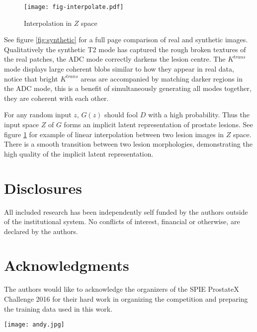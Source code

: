 \documentclass[a4paper,12pt]{spieman}  %
\newcommand{\ktrans}{$K^{\mathit{trans}}$}
\begin{document}
\begin{spacing}{1}
\begin{figure}
\begin{center}
  \texttt{[image: fig-interpolate.pdf]}
\end{center}
\caption{Interpolation in $Z$ space}
\label{fig:interpolation}
\end{figure}

	See figure \ref{fig:synthetic} for a full page comparison of real and
	synthetic images. Qualitatively the synthetic T2 mode has captured
	the rough broken textures of the real patches, the ADC mode correctly
	darkens the lesion centre. The \ktrans{} mode displays large coherent
	blobs similar to how they appear in real data, notice that bright
	\ktrans{} areas are accompanied by matching darker regions in the ADC
	mode, this is a benefit of simultaneously generating all modes
	together, they are coherent with each other.

	For any random input $z$, $G(z)$ should fool $D$ with a high
	probability. Thus the input space $Z$ of $G$ forms an implicit latent
	representation of prostate lesions. See figure \ref{fig:interpolation}
	for example of linear interpolation between two lesion images in $Z$
	space.  There is a smooth transition between two lesion morphologies,
	demonstrating the high quality of the implicit latent representation.
	

\section{Disclosures}

	All included research has been independently self funded by the authors
	outside of the institutional system.  No conflicts of interest,
	financial or otherwise, are declared by the authors.

\section{Acknowledgments}

	The authors would like to acknowledge the organizers of the SPIE
	ProstateX Challenge 2016 for their hard work in organizing the
	competition and preparing the training data used in this work.




\vspace{1\baselineskip}

\noindent
\begin{minipage}[c]{0.2\textwidth}
\texttt{[image: andy.jpg]}
\end{minipage}
\begin{minipage}[c]{0.8\textwidth}


\end{minipage}
\end{spacing}
\end{document}
